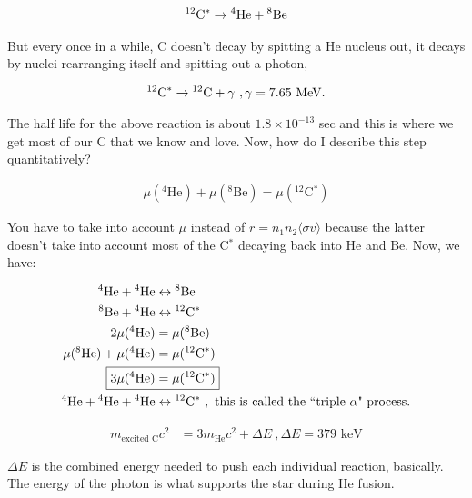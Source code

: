 \begin{align}
\textrm{$^{12}$C$^*$} \rightarrow \textrm{$^{4}$He}+ \textrm{$^{8}$Be}
\end{align}

But every once in a while, C doesn't decay by spitting a He nucleus out, it decays by nuclei rearranging itself and spitting out a photon,

\begin{align}
^{12}\textrm{C}^* \rightarrow \textrm{$^{12}$C}+ \gamma~, \gamma = 7.65 \textrm{ MeV.}
\end{align}

The half life for the above reaction is about $1.8 \times 10^{-13}$ sec and this is where we get most of our C that we know and love. Now, how do I describe this step quantitatively? 

\begin{align}
\mu(\textrm{$^{4}$He}) + \mu(\textrm{$^{8}$Be})=\mu(\textrm{$^{12}$C$^*$} )
\end{align}

You have to take into account $\mu$ instead of $r=n_1n_2\langle \sigma v\rangle $ because the latter doesn't take into account most of the C$^*$ decaying back into He and Be. Now, we have:

\begin{align}
\textrm{$^{4}$He} + \textrm{$^{4}$He} &\leftrightarrow \textrm{$^{8}$Be} \\
\textrm{$^{8}$Be}  + \textrm{$^{4}$He} &\leftrightarrow \textrm{$^{12}$C$^*$}\\
2 \mu(^4\textrm{He}) &= \mu(^8\textrm{Be})\\
\mu(^8\textrm{He}) + \mu(^4\textrm{He}) &= \mu(^{12}\textrm{C}^*)\\
\Aboxed{3\mu(^4\textrm{He}) &= \mu(^{12}\textrm{C}^*)}\\
^4\textrm{He} + \textrm{$^{4}$He} + \textrm{$^{4}$He} &\leftrightarrow \textrm{$^{12}$C$^*$}~,\textrm{ this is called the ``triple $\alpha$" process.}
\end{align}

\begin{align}
m_{\textrm{excited C}}c^2 &= 3m_{\textrm{He}}c^2 + \Delta E~, \Delta E = 379 \textrm{ keV}
\end{align}

$\Delta E$ is the combined energy needed to push each individual reaction, basically. The energy of the photon is what supports the star during He fusion.\\


